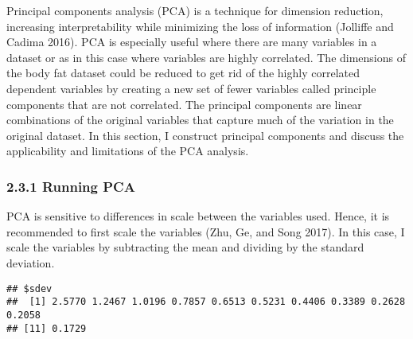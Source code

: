 \documentclass[
]{article}
\begin{document}
Principal components analysis (PCA) is a technique for dimension
reduction, increasing interpretability while minimizing the loss of
information (Jolliffe and Cadima 2016). PCA is especially useful where
there are many variables in a dataset or as in this case where variables
are highly correlated. The dimensions of the body fat dataset could be
reduced to get rid of the highly correlated dependent variables by
creating a new set of fewer variables called principle components that
are not correlated. The principal components are linear combinations of
the original variables that capture much of the variation in the
original dataset. In this section, I construct principal components and
discuss the applicability and limitations of the PCA analysis.

\hypertarget{running-pca}{%
\subsubsection{\texorpdfstring{\textbf{2.3.1 Running
PCA}}{2.3.1 Running PCA}}\label{running-pca}}

PCA is sensitive to differences in scale between the variables used.
Hence, it is recommended to first scale the variables (Zhu, Ge, and Song
2017). In this case, I scale the variables by subtracting the mean and
dividing by the standard deviation.

\begin{verbatim}
## $sdev
##  [1] 2.5770 1.2467 1.0196 0.7857 0.6513 0.5231 0.4406 0.3389 0.2628 0.2058
## [11] 0.1729
\end{verbatim}
\end{document}
